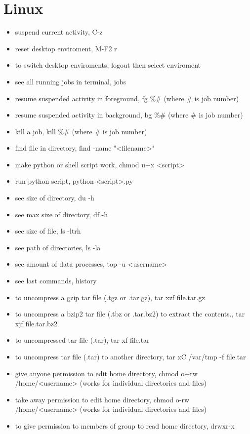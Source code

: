 \documentclass[11pt]{article}
\begin{document}
\section{Linux}
\label{sec:orgf6d2068}
\begin{itemize}
\item suspend current activity, C-z
\item reset desktop enviroment, M-F2 r
\item to switch desktop enviroments, logout then select enviroment
\item see all running jobs in terminal, jobs
\item resume suspended activity in foreground, fg \%\# (where \# is job number)
\item resume suspended activity in background, bg \%\# (where \# is job number)
\item kill a job, kill \%\# (where \# is job number)
\item find file in directory, find -name "<filename>"
\item make python or shell script work, chmod u+x <script>
\item run python script, python <script>.py
\item see size of directory, du -h
\item see max size of directory, df -h
\item see size of file, ls -ltrh
\item see path of directories, ls -la
\item see amount of data processes, top -u <username>
\item see last commands, history
\item to uncompress a gzip tar file (.tgz or .tar.gz), tar xzf file.tar.gz
\item to uncompress a bzip2 tar file (.tbz or .tar.bz2) to extract the contents., tar xjf file.tar.bz2
\item to uncompressed tar file (.tar), tar xf file.tar
\item to uncompress tar file (.tar) to another directory, tar xC /var/tmp -f file.tar
\item give anyone permission to edit home directory, chmod o+rw /home/<username> (works for individual directories and files)
\item take away permission to edit home directory, chmod o-rw /home/<username> (works for individual directories and files)
\item to give permission to members of group to read home directory, drwxr-x

\end{itemize}
\end{document}
